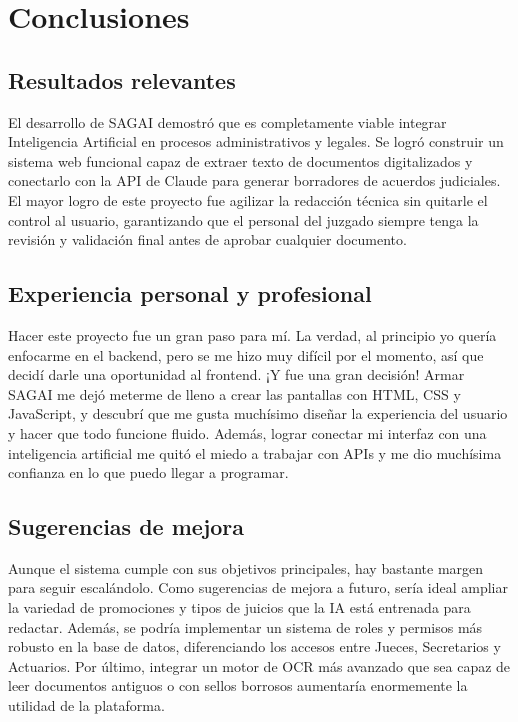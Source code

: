 \section{Conclusiones}

\subsection{Resultados relevantes}
El desarrollo de SAGAI demostró que es completamente viable integrar Inteligencia Artificial en procesos administrativos y legales. Se logró construir un sistema web funcional capaz de extraer texto de documentos digitalizados y conectarlo con la API de Claude para generar borradores de acuerdos judiciales. El mayor logro de este proyecto fue agilizar la redacción técnica sin quitarle el control al usuario, garantizando que el personal del juzgado siempre tenga la revisión y validación final antes de aprobar cualquier documento.

\subsection{Experiencia personal y profesional}
Hacer este proyecto fue un gran paso para mí. La verdad, al principio yo quería enfocarme en el backend, pero se me hizo muy difícil por el momento, así que decidí darle una oportunidad al frontend. ¡Y fue una gran decisión! Armar SAGAI me dejó meterme de lleno a crear las pantallas con HTML, CSS y JavaScript, y descubrí que me gusta muchísimo diseñar la experiencia del usuario y hacer que todo funcione fluido. Además, lograr conectar mi interfaz con una inteligencia artificial me quitó el miedo a trabajar con APIs y me dio muchísima confianza en lo que puedo llegar a programar.

\subsection{Sugerencias de mejora}
Aunque el sistema cumple con sus objetivos principales, hay bastante margen para seguir escalándolo. Como sugerencias de mejora a futuro, sería ideal ampliar la variedad de promociones y tipos de juicios que la IA está entrenada para redactar. Además, se podría implementar un sistema de roles y permisos más robusto en la base de datos, diferenciando los accesos entre Jueces, Secretarios y Actuarios. Por último, integrar un motor de OCR más avanzado que sea capaz de leer documentos antiguos o con sellos borrosos aumentaría enormemente la utilidad de la plataforma.